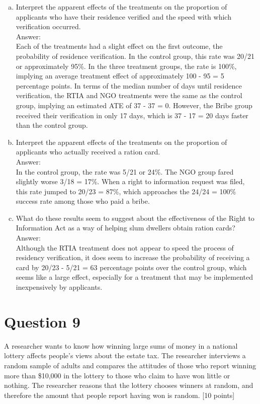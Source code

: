 \documentclass[11pt,notitlepage]{article}		%
\begin{document}
\begin{enumerate}[a)]

\item Interpret the apparent effects of the treatments on the proportion of applicants who have their residence verified and the speed with which verification occurred. \\
Answer:\\
Each of the treatments had a slight effect on the first outcome, the probability of residence verification.  In the control group, this rate was 20/21 or approximately 95\%.  In the three treatment groups, the rate is 100\%, implying an average treatment effect of approximately 100 - 95 = 5 percentage points.  In terms of the median number of days until residence verification, the RTIA and NGO treatments were the same as the control group, implying an estimated ATE of 37 - 37 = 0.  However, the Bribe group received their verification in only 17 days, which is 37 - 17 = 20 days faster than the control group. 
\item Interpret the apparent effects of the treatments on the proportion of applicants who actually received a ration card. \\
Answer:\\
In the control group, the rate was 5/21 or 24\%.  The NGO group fared slightly worse 3/18 = 17\%.  When a right to information request was filed, this rate jumped to 20/23 = 87\%, which approaches the 24/24 = 100\% success rate among those who paid a bribe.   
\item What do these results seem to suggest about the effectiveness of the Right to Information Act as a way of helping slum dwellers obtain ration cards?  \\
Answer:\\
Although the RTIA treatment does not appear to speed the process of residency verification, it does seem to increase the probability of receiving a card by 20/23 - 5/21 = 63 percentage points over the control group, which seems like a large effect, especially for a treatment that may be implemented inexpensively by applicants.
\end{enumerate}

\section*{Question 9}
A researcher wants to know how winning large sums of money in a national lottery affects people's views about the estate tax.  The researcher interviews a random sample of adults and compares the attitudes of those who report winning more than \$10,000 in the lottery to those who claim to have won little or nothing. The researcher reasons that the lottery chooses winners at random, and therefore the amount that people report having won is random. [10 points]
\end{document}
